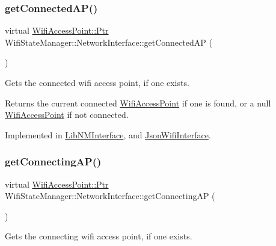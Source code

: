 \subsubsection{\texorpdfstring{get\+Connected\+A\+P()}{getConnectedAP()}}
{\footnotesize\ttfamily virtual \mbox{\hyperlink{classWifiAccessPoint_ad18977f884076774803027efbaa131a0}{Wifi\+Access\+Point\+::\+Ptr}} Wifi\+State\+Manager\+::\+Network\+Interface\+::get\+Connected\+AP (\begin{DoxyParamCaption}{ }\end{DoxyParamCaption})\hspace{0.3cm}{\ttfamily [pure virtual]}}

Gets the connected wifi access point, if one exists.

\begin{DoxyReturn}{Returns}
the current connected \mbox{\hyperlink{classWifiAccessPoint}{Wifi\+Access\+Point}} if one is found, or a null \mbox{\hyperlink{classWifiAccessPoint}{Wifi\+Access\+Point}} if not connected. 
\end{DoxyReturn}


Implemented in \mbox{\hyperlink{classLibNMInterface_a92020826593a03979017bd7fb0c143a5}{Lib\+N\+M\+Interface}}, and \mbox{\hyperlink{classJsonWifiInterface_a9c42aee1d88451e199646732f60e125a}{Json\+Wifi\+Interface}}.

\mbox{\label{classWifiStateManager_1_1NetworkInterface_abff4fdeee0026c367dccc03828a88cc2}} 
\subsubsection{\texorpdfstring{get\+Connecting\+A\+P()}{getConnectingAP()}}
{\footnotesize\ttfamily virtual \mbox{\hyperlink{classWifiAccessPoint_ad18977f884076774803027efbaa131a0}{Wifi\+Access\+Point\+::\+Ptr}} Wifi\+State\+Manager\+::\+Network\+Interface\+::get\+Connecting\+AP (\begin{DoxyParamCaption}{ }\end{DoxyParamCaption})\hspace{0.3cm}{\ttfamily [pure virtual]}}

Gets the connecting wifi access point, if one exists.

